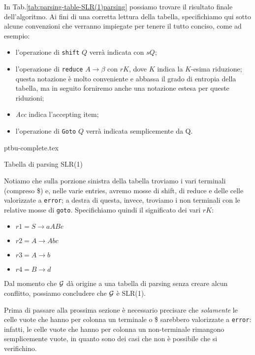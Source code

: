 \documentclass[class=book, crop=false, oneside, 12pt]{standalone}
\begin{document}
In Tab.\ref{tab:parsing-table-SLR(1)parsing} possiamo trovare il risultato finale dell'algoritmo. Ai fini di una corretta lettura della tabella, specifichiamo qui sotto alcune convenzioni che verranno impiegate per tenere il tutto conciso, come ad esempio:
\begin{itemize}
    \item l'operazione di \texttt{shift} \(Q\) verrà indicata con \(sQ\);
    \item l'operazione di \texttt{reduce} \(A \rightarrow \beta\) con \(rK\), dove \(K\) indica la \(K\)-esima riduzione; questa notazione è molto conveniente e abbassa il grado di entropia della tabella, ma in seguito forniremo anche una notazione estesa per queste riduzioni;
    \item \emph{Acc} indica l'accepting item;
    \item l'operazione di \texttt{Goto} \(Q\) verrà indicata semplicemente da Q.
\end{itemize}
\begin{table}[H]
    \centering
    {ptbu-complete.tex}
    \caption{Tabella di parsing SLR(1)}
    \label{tab:parsing-table-SLR(1)parsing}
\end{table}
Notiamo che sulla porzione sinistra della tabella troviamo i vari terminali (compreso \$) e, nelle varie entries, avremo mosse di shift, di reduce e delle celle valorizzate a \texttt{error}; a destra di questa, invece, troviamo i non terminali con le relative mosse di \texttt{goto}.
Specifichiamo quindi il significato dei vari \(rK\):
\begin{itemize}
    \item \(r1 = S \to aABe\)
    \item \(r2 = A \to Abc\)
    \item \(r3 = A \to b\)
    \item \(r4 = B \to d\)
\end{itemize}
Dal momento che \(\mathcal{G}\) dà origine a una tabella di parsing senza creare alcun conflitto, possiamo concludere che \(\mathcal{G}\) è SLR(1).

Prima di passare alla prossima sezione è necessario precisare che \emph{solamente} le celle vuote che hanno per colonna un terminale o \$ sarebbero valorizzate a \texttt{error}: infatti, le celle vuote che hanno per colonna un non-terminale rimangono semplicemente vuote, in quanto sono dei casi che non è possibile che si verifichino. 
\end{document}
